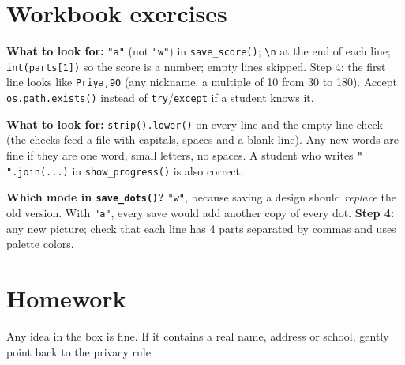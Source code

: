 
\section{Workbook exercises}
\begin{answer}
\textbf{What to look for:} \texttt{"a"} (not \texttt{"w"}) in \texttt{save\_score()}; \texttt{\textbackslash n} at the end of each line;
\texttt{int(parts[1])} so the score is a number; empty lines skipped. Step 4: the first line looks like \texttt{Priya,90} (any nickname,
a multiple of 10 from 30 to 180). Accept \texttt{os.path.exists()} instead of \texttt{try}/\texttt{except} if a student knows it.
\end{answer}

\begin{answer}
\textbf{What to look for:} \texttt{strip().lower()} on every line and the empty-line check (the checks feed a file with capitals, spaces and a blank line).
Any new words are fine if they are one word, small letters, no spaces. A student who writes \texttt{" ".join(...)} in \texttt{show\_progress()} is also correct.
\end{answer}

\begin{answer}
\textbf{Which mode in \texttt{save\_dots()}?} \texttt{"w"}, because saving a design should \emph{replace} the old version. With \texttt{"a"},
every save would add another copy of every dot. \textbf{Step 4:} any new picture; check that each line has 4 parts separated by commas and uses palette colors.
\end{answer}

\section{Homework}
\begin{answer}
Any idea in the box is fine. If it contains a real name, address or school, gently point back to the privacy rule.
\end{answer}

